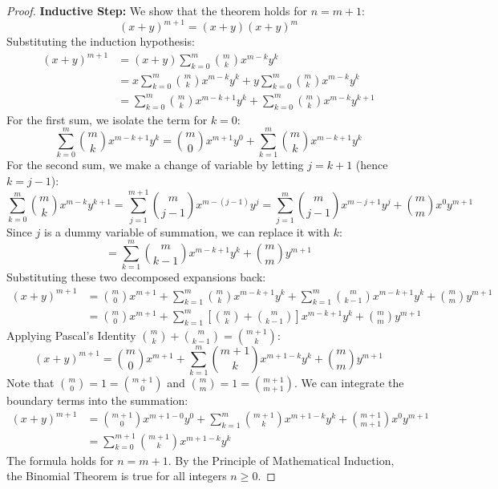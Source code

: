 \documentclass[10pt,journal,compsoc,onecolumn]{IEEEtran}
\begin{document}
\begin{proof}
\textbf{Inductive Step:}
We show that the theorem holds for $n = m + 1$:
\begin{equation}
(x + y)^{m+1} = (x + y) (x + y)^m
\end{equation}
Substituting the induction hypothesis:
\begin{align}
(x + y)^{m+1} &= (x + y) \sum_{k=0}^{m} \binom{m}{k} x^{m - k} y^k \\
&= x \sum_{k=0}^{m} \binom{m}{k} x^{m - k} y^k + y \sum_{k=0}^{m} \binom{m}{k} x^{m - k} y^k \\
&= \sum_{k=0}^{m} \binom{m}{k} x^{m - k + 1} y^k + \sum_{k=0}^{m} \binom{m}{k} x^{m - k} y^{k + 1}
\end{align}
For the first sum, we isolate the term for $k = 0$:
\begin{equation}
\sum_{k=0}^{m} \binom{m}{k} x^{m - k + 1} y^k = \binom{m}{0} x^{m+1} y^0 + \sum_{k=1}^{m} \binom{m}{k} x^{m - k + 1} y^k
\end{equation}
For the second sum, we make a change of variable by letting $j = k + 1$ (hence $k = j - 1$):
\begin{equation}
\sum_{k=0}^{m} \binom{m}{k} x^{m - k} y^{k+1} = \sum_{j=1}^{m+1} \binom{m}{j - 1} x^{m - (j - 1)} y^j = \sum_{j=1}^{m} \binom{m}{j - 1} x^{m - j + 1} y^j + \binom{m}{m} x^0 y^{m+1}
\end{equation}
Since $j$ is a dummy variable of summation, we can replace it with $k$:
\begin{equation}
= \sum_{k=1}^{m} \binom{m}{k - 1} x^{m - k + 1} y^k + \binom{m}{m} y^{m+1}
\end{equation}
Substituting these two decomposed expansions back:
\begin{align}
(x + y)^{m+1} &= \binom{m}{0} x^{m+1} + \sum_{k=1}^{m} \binom{m}{k} x^{m - k + 1} y^k + \sum_{k=1}^{m} \binom{m}{k - 1} x^{m - k + 1} y^k + \binom{m}{m} y^{m+1} \\
&= \binom{m}{0} x^{m+1} + \sum_{k=1}^{m} \left[ \binom{m}{k} + \binom{m}{k - 1} \right] x^{m - k + 1} y^k + \binom{m}{m} y^{m+1}
\end{align}
Applying Pascal's Identity $\binom{m}{k} + \binom{m}{k - 1} = \binom{m+1}{k}$:
\begin{equation}
(x + y)^{m+1} = \binom{m}{0} x^{m+1} + \sum_{k=1}^{m} \binom{m+1}{k} x^{m+1 - k} y^k + \binom{m}{m} y^{m+1}
\end{equation}
Note that $\binom{m}{0} = 1 = \binom{m+1}{0}$ and $\binom{m}{m} = 1 = \binom{m+1}{m+1}$. We can integrate the boundary terms into the summation:
\begin{align}
(x + y)^{m+1} &= \binom{m+1}{0} x^{m+1 - 0} y^0 + \sum_{k=1}^{m} \binom{m+1}{k} x^{m+1 - k} y^k + \binom{m+1}{m+1} x^0 y^{m+1} \\
&= \sum_{k=0}^{m+1} \binom{m+1}{k} x^{m+1 - k} y^k
\end{align}
The formula holds for $n = m+1$. By the Principle of Mathematical Induction, the Binomial Theorem is true for all integers $n \geq 0$.
\end{proof}
\end{document}

